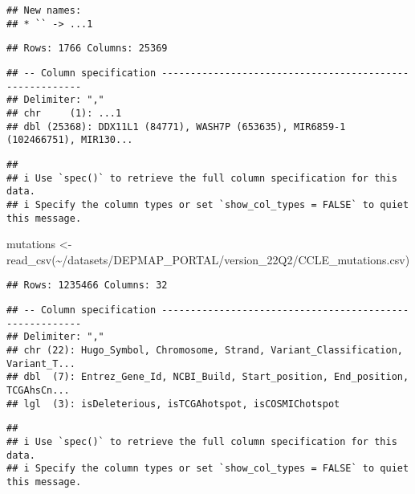\documentclass[
]{article}
\newenvironment{Shaded}{\begin{snugshade}}{\end{snugshade}}
\newcommand{\FunctionTok}[1]{\textcolor[rgb]{0.00,0.00,0.00}{#1}}
\newcommand{\NormalTok}[1]{#1}
\newcommand{\OtherTok}[1]{\textcolor[rgb]{0.56,0.35,0.01}{#1}}
\newcommand{\StringTok}[1]{\textcolor[rgb]{0.31,0.60,0.02}{#1}}
\begin{document}
\begin{verbatim}
## New names:
## * `` -> ...1
\end{verbatim}

\begin{verbatim}
## Rows: 1766 Columns: 25369
\end{verbatim}

\begin{verbatim}
## -- Column specification --------------------------------------------------------
## Delimiter: ","
## chr     (1): ...1
## dbl (25368): DDX11L1 (84771), WASH7P (653635), MIR6859-1 (102466751), MIR130...
\end{verbatim}

\begin{verbatim}
## 
## i Use `spec()` to retrieve the full column specification for this data.
## i Specify the column types or set `show_col_types = FALSE` to quiet this message.
\end{verbatim}

\begin{Shaded}
\begin{Highlighting}[]
\NormalTok{mutations }\OtherTok{\textless{}{-}} \FunctionTok{read\_csv}\NormalTok{(}\StringTok{\textquotesingle{}\textasciitilde{}/datasets/DEPMAP\_PORTAL/version\_22Q2/CCLE\_mutations.csv\textquotesingle{}}\NormalTok{)}
\end{Highlighting}
\end{Shaded}

\begin{verbatim}
## Rows: 1235466 Columns: 32
\end{verbatim}

\begin{verbatim}
## -- Column specification --------------------------------------------------------
## Delimiter: ","
## chr (22): Hugo_Symbol, Chromosome, Strand, Variant_Classification, Variant_T...
## dbl  (7): Entrez_Gene_Id, NCBI_Build, Start_position, End_position, TCGAhsCn...
## lgl  (3): isDeleterious, isTCGAhotspot, isCOSMIChotspot
\end{verbatim}

\begin{verbatim}
## 
## i Use `spec()` to retrieve the full column specification for this data.
## i Specify the column types or set `show_col_types = FALSE` to quiet this message.
\end{verbatim}
\end{document}
